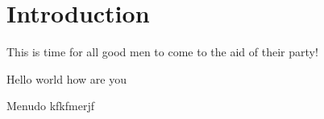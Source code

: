 \section{Introduction}
This is time for all good men to come to the aid of their party!

Hello world how are you

Menudo kfkfmerjf



